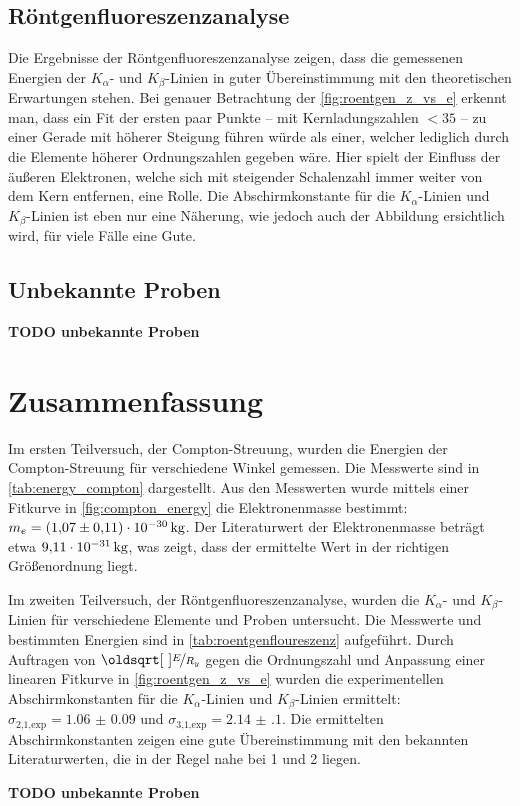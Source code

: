 \documentclass[ngerman]{scrartcl}
\begin{document}
\subsection{Röntgenfluoreszenzanalyse}
\label{sec:diskussion_roentgen}
Die Ergebnisse der Röntgenfluoreszenzanalyse zeigen, dass die gemessenen Energien der $K_{\alpha}$- und $K_{\beta}$-Linien in guter Übereinstimmung mit den theoretischen Erwartungen stehen. Bei genauer Betrachtung der \autoref{fig:roentgen_z_vs_e} erkennt man, dass ein Fit der ersten paar Punkte -- mit Kernladungszahlen $<35$ -- zu einer Gerade mit höherer Steigung führen würde als einer, welcher lediglich durch die Elemente höherer Ordnungszahlen gegeben wäre. Hier spielt der Einfluss der äußeren Elektronen, welche sich mit steigender Schalenzahl immer weiter von dem Kern entfernen, eine Rolle. Die Abschirmkonstante für die $K_{\alpha}$-Linien und $K_{\beta}$-Linien ist eben nur eine Näherung, wie jedoch auch der Abbildung ersichtlich wird, für viele Fälle eine Gute.

\subsection{Unbekannte Proben}
\label{sec:diskussion_unbekannt}
\textbf{TODO unbekannte Proben}


\section{Zusammenfassung}
\label{sec:zusammenfassung}
Im ersten Teilversuch, der Compton-Streuung, wurden die Energien der Compton-Streuung für verschiedene Winkel gemessen. Die Messwerte sind in \autoref{tab:energy_compton} dargestellt. Aus den Messwerten wurde mittels einer Fitkurve in \autoref{fig:compton_energy} die Elektronenmasse bestimmt: $m_e = \SI{1.07(11)E-30}{\kilogram}$. Der Literaturwert der Elektronenmasse beträgt etwa $\SI{9.11E-31}{\kilogram}$, was zeigt, dass der ermittelte Wert in der richtigen Größenordnung liegt.

Im zweiten Teilversuch, der Röntgenfluoreszenzanalyse, wurden die $K_{\alpha}$- und $K_{\beta}$-Linien für verschiedene Elemente und Proben untersucht. Die Messwerte und bestimmten Energien sind in \autoref{tab:roentgenfloureszenz} aufgeführt. Durch Auftragen von $\sqrt{\nicefrac{E}{R_y}}$ gegen die Ordnungszahl und Anpassung einer linearen Fitkurve in \autoref{fig:roentgen_z_vs_e} wurden die experimentellen Abschirmkonstanten für die $K_{\alpha}$-Linien und $K_{\beta}$-Linien ermittelt: $\sigma_{\text{2,1,exp}} = \num{1.06(9)}$ und $\sigma_{\text{3,1,exp}} = \num{2.14(10)}$. Die ermittelten Abschirmkonstanten zeigen eine gute Übereinstimmung mit den bekannten Literaturwerten, die in der Regel nahe bei 1 und 2 liegen.

\textbf{TODO unbekannte Proben}
\clearpage
\printbibliography

\listoffigures

\listoftables
\end{document}
